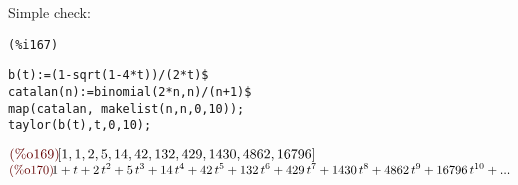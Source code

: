 Simple check:

\noindent
\begin{minipage}[t]{8ex}{\color{red}\bf
\begin{verbatim}
(%i167) 
\end{verbatim}}
\end{minipage}
\begin{minipage}[t]{\textwidth}{\color{blue}
\begin{verbatim}
b(t):=(1-sqrt(1-4*t))/(2*t)$
catalan(n):=binomial(2*n,n)/(n+1)$
map(catalan, makelist(n,n,0,10));
taylor(b(t),t,0,10);
\end{verbatim}}
\end{minipage}
\begin{math}\displaystyle
\parbox{8ex}{\color{labelcolor}(\%o169) }
[1,1,2,5,14,42,132,429,1430,4862,16796]
\end{math}\\
\begin{math}\displaystyle
\parbox{8ex}{\color{labelcolor}(\%o170) }
1+t+2\,{t}^{2}+5\,{t}^{3}+14\,{t}^{4}+42\,{t}^{5}+132\,{t}^{6}+429\,{t}^{7}+1430\,{t}^{8}+4862\,{t}^{9}+16796\,{t}^{10}+...
\end{math}









